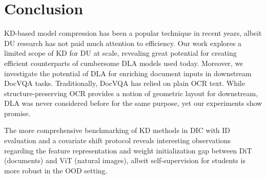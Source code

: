 \documentclass[runningheads]{llncs}
\begin{document}
\section{Conclusion}
KD-based model compression has been a popular technique in recent years, albeit DU research has not paid much attention to efficiency.
Our work explores a limited scope of KD for DU at scale, revealing great potential for creating efficient counterparts of cumbersome DLA models used today.
Moreover, we investigate the potential of DLA for enriching document inputs in downstream DocVQA tasks.
Traditionally, DocVQA has relied on plain OCR text. While structure-preserving OCR provides a notion of geometric layout for downstream, DLA was never considered before for the same purpose, yet our experiments show promise.

The more comprehensive benchmarking of KD methods in DIC with ID evaluation and a covariate shift protocol reveals interesting observations regarding the feature representation and weight initialization gap between DiT (documents) and ViT (natural images), albeit self-supervision for students is more robust in the OOD setting.



\end{document}
